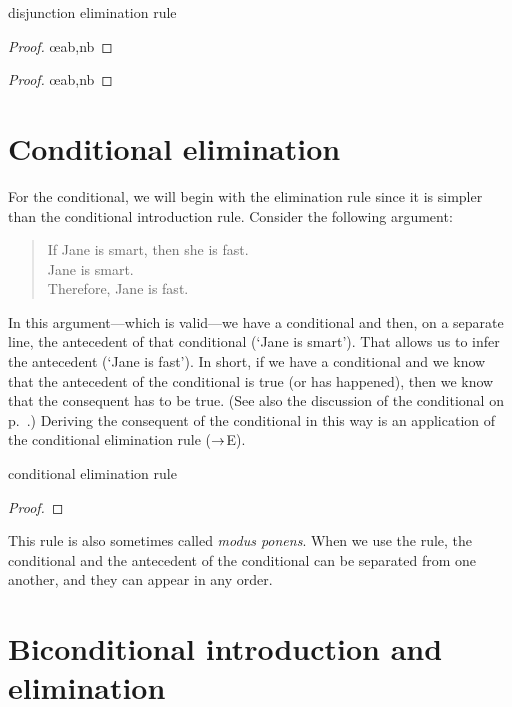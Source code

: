 \begin{factboxy}{disjunction elimination rule}
\begin{proof}
	 \oe{ab,nb}
\end{proof}

\begin{proof}
	 \oe{ab,nb}
\end{proof}
\end{factboxy}

\section{Conditional elimination}

For the conditional, we will begin with the elimination rule since it is simpler than the conditional introduction rule. Consider the following argument:
	\begin{quote}
		If Jane is smart, then she is fast.\\
		Jane is smart.\\ 
		Therefore, Jane is fast.
	\end{quote}
In this argument---which is valid---we have a conditional and then, on a separate line, the antecedent of that conditional (`Jane is smart'). That allows us to infer the antecedent (`Jane is fast'). In short, if we have a conditional and we know that the antecedent of the conditional is true (or has happened), then we know that the consequent has to be true. (See also the discussion of the conditional on p.~\pageref{characteristic-tt-conditional}.) Deriving the consequent of the conditional in this way is an application of the conditional elimination rule ($\rightarrow$E).
\begin{factboxy}{conditional elimination rule}\label{ce-rule}
\begin{proof}
	 
\end{proof}
\end{factboxy}
This rule is also sometimes called \emph{modus ponens}. When we use the rule, the conditional and the antecedent of the conditional can be separated from one another, and they can appear in any order.


\section{Biconditional introduction and elimination} 

